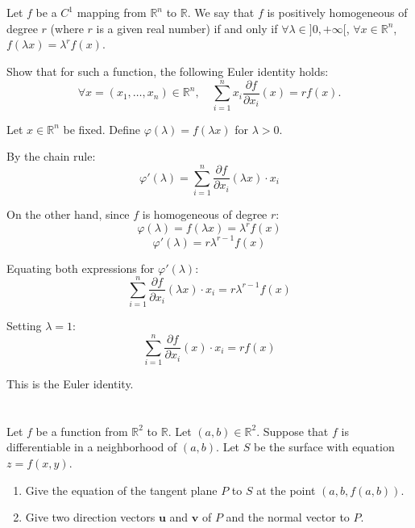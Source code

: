 \documentclass[12pt]{article}
\begin{document}
\section{}
Let $f$ be a $C^1$ mapping from $\mathbb{R}^n$ to $\mathbb{R}$. We say that $f$ is positively homogeneous of degree $r$ (where $r$ is a given real number) if and only if $\forall \lambda \in ]0, +\infty[$, $\forall x \in \mathbb{R}^n$, $f(\lambda x) = \lambda^r f(x)$.

Show that for such a function, the following Euler identity holds:
$$\forall x = (x_1, \ldots, x_n) \in \mathbb{R}^n, \quad \sum_{i=1}^{n} x_i \frac{\partial f}{\partial x_i}(x) = rf(x).$$

\begin{correctionbox}
Let $x \in \mathbb{R}^n$ be fixed. Define $\varphi(\lambda) = f(\lambda x)$ for $\lambda > 0$.

By the chain rule:
$$\varphi'(\lambda) = \sum_{i=1}^n \frac{\partial f}{\partial x_i}(\lambda x) \cdot x_i$$

On the other hand, since $f$ is homogeneous of degree $r$:
$$\varphi(\lambda) = f(\lambda x) = \lambda^r f(x)$$
$$\varphi'(\lambda) = r\lambda^{r-1} f(x)$$

Equating both expressions for $\varphi'(\lambda)$:
$$\sum_{i=1}^n \frac{\partial f}{\partial x_i}(\lambda x) \cdot x_i = r\lambda^{r-1} f(x)$$

Setting $\lambda = 1$:
$$\sum_{i=1}^n \frac{\partial f}{\partial x_i}(x) \cdot x_i = r f(x)$$

This is the Euler identity.
\end{correctionbox}

\section{}
Let $f$ be a function from $\mathbb{R}^2$ to $\mathbb{R}$. Let $(a, b) \in \mathbb{R}^2$. Suppose that $f$ is differentiable in a neighborhood of $(a, b)$. Let $S$ be the surface with equation $z = f(x, y)$.

\begin{enumerate}
    \item Give the equation of the tangent plane $P$ to $S$ at the point $(a, b, f(a, b))$.
    \item Give two direction vectors $\mathbf{u}$ and $\mathbf{v}$ of $P$ and the normal vector to $P$.
\end{enumerate}
\end{document}
